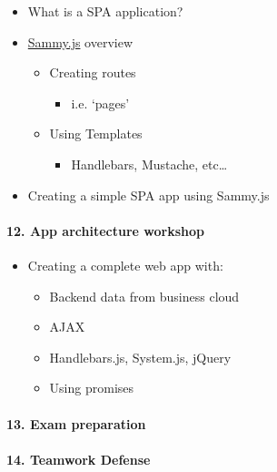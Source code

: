\begin{itemize}
\tightlist
\item
  What is a SPA application?
\item
  \href{http://sammyjs.org/}{Sammy.js} overview

  \begin{itemize}
  \tightlist
  \item
    Creating routes

    \begin{itemize}
    \tightlist
    \item
      i.e. `pages'
    \end{itemize}
  \item
    Using Templates

    \begin{itemize}
    \tightlist
    \item
      Handlebars, Mustache, etc\ldots{}
    \end{itemize}
  \end{itemize}
\item
  Creating a simple SPA app using Sammy.js
\end{itemize}

\paragraph{12. App architecture
workshop}\label{app-architecture-workshop}

\begin{itemize}
\tightlist
\item
  Creating a complete web app with:

  \begin{itemize}
  \tightlist
  \item
    Backend data from business cloud
  \item
    AJAX
  \item
    Handlebars.js, System.js, jQuery
  \item
    Using promises
  \end{itemize}
\end{itemize}

\paragraph{13. Exam preparation}\label{exam-preparation}

\paragraph{14. Teamwork Defense}\label{teamwork-defense}

